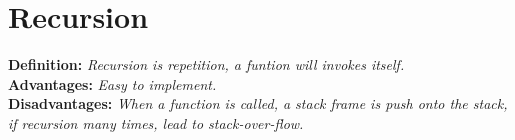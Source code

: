 \documentclass{article}
\begin{document}
\section{Recursion}

\textbf{Definition:} \textit{Recursion is repetition, a funtion will invokes itself.}\\
\textbf{Advantages:} \textit{Easy to implement.}\\
\textbf{Disadvantages:} \textit{When a function is called, a stack frame is push onto the stack, if recursion many times, lead to stack-over-flow.}\\
\end{document}
